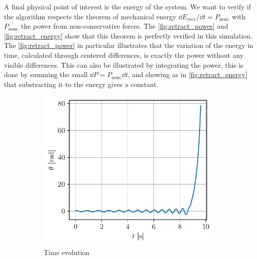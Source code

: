 A final physical point of interest is the energy of the system. We want to verify if the algorithm respects the theorem of mechanical energy $\dd E_{mec}/\dd t = P_\mathrm{nonc}$ with $P_\mathrm{nonc}$ the power from non-conservative forces. The \autoref{fig:retract_power} and \autoref{fig:retract_energy} show that this theorem is perfectly verified in this simulation. The \autoref{fig:retract_power} in particular illustrates that the variation of the energy in time, calculated through centered differences, is exactly the power without any visible differences. This can also be illustrated by integrating the power, this is done by summing the small $\dd P = P_\mathrm{nonc} \dd t$, and showing as in \autoref{fig:retract_energy} that substracting it to the energy gives a constant.
\begin{figure}[h]
    \centering
    \begin{subfigure}{0.48\linewidth}
        \centering
        \includegraphics[width=\linewidth]{figures/traj_retraction.pdf}
        \caption{Time evolution}
        \label{fig:retract_time}
    \end{subfigure}
    \begin{subfigure}{0.48\linewidth}
        \centering

\end{subfigure}
\end{figure}

